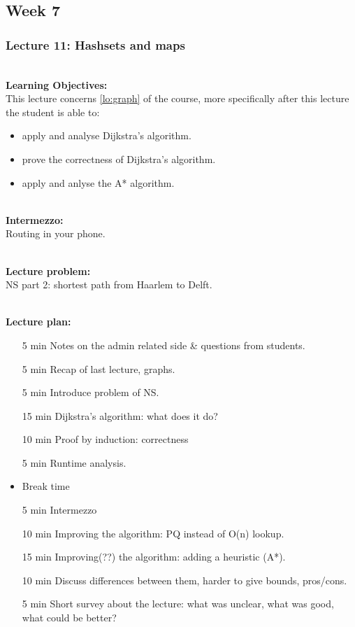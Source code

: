 \subsection{Week 7}
\label{sub:week_7}

\subsubsection{Lecture 11: Hashsets and maps}
\label{sub:lecture_11}

\hfill\\
\textbf{Learning Objectives:}\\
This lecture concerns \cref{lo:graph} of the course, more specifically after this lecture the student is able
to:
\begin{itemize}
	\item apply and analyse Dijkstra's algorithm.
	\item prove the correctness of Dijkstra's algorithm.
	\item apply and anlyse the A* algorithm.
\end{itemize}

\hfill\\
\textbf{Intermezzo:}\\
Routing in your phone.

\hfill\\
\textbf{Lecture problem:}\\
NS part 2: shortest path from Haarlem to Delft.

\hfill\\
\textbf{Lecture plan:}\\
\begin{itemize}
	\item[5 min] Notes on the admin related side \& questions from students.
	\item[5 min] Recap of last lecture, graphs.
	\item[5 min] Introduce problem of NS.
	\item[15 min] Dijkstra's algorithm: what does it do?
	\item[10 min] Proof by induction: correctness
	\item[5 min] Runtime analysis.
	\item Break time
	\item[5 min] Intermezzo
	\item[10 min] Improving the algorithm: PQ instead of O(n) lookup.
	\item[15 min] Improving(??) the algorithm: adding a heuristic (A*).
	\item[10 min] Discuss differences between them, harder to give bounds, pros/cons.
	\item[5 min] Short survey about the lecture: what was unclear, what was good, what could be better?
\end{itemize}

